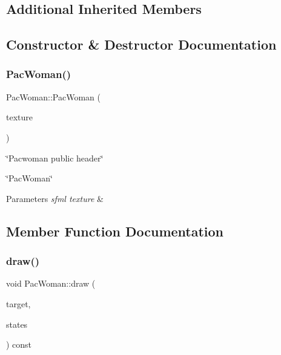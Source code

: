 \subsection*{Additional Inherited Members}


\subsection{Constructor \& Destructor Documentation}
\mbox{\label{classPacWoman_a21e0c1f228e09eb07199eac5e2f0ba77}} 
\subsubsection{\texorpdfstring{Pac\+Woman()}{PacWoman()}}
{\footnotesize\ttfamily Pac\+Woman\+::\+Pac\+Woman (\begin{DoxyParamCaption}\item[{sf\+::\+Texture \&}]{texture }\end{DoxyParamCaption})}



\char`\"{}\+Pacwoman public header\char`\"{} 

\char`\"{}\+Pac\+Woman\char`\"{}


\begin{DoxyParams}{Parameters}
{\em sfml texture} & \\
\hline
\end{DoxyParams}


\subsection{Member Function Documentation}
\mbox{\label{classPacWoman_a43d3869ad2b68f87d142525409cadf09}} 
\subsubsection{\texorpdfstring{draw()}{draw()}}
{\footnotesize\ttfamily void Pac\+Woman\+::draw (\begin{DoxyParamCaption}\item[{sf\+::\+Render\+Target \&}]{target,  }\item[{sf\+::\+Render\+States}]{states }\end{DoxyParamCaption}) const\hspace{0.3cm}{\ttfamily [private]}}



